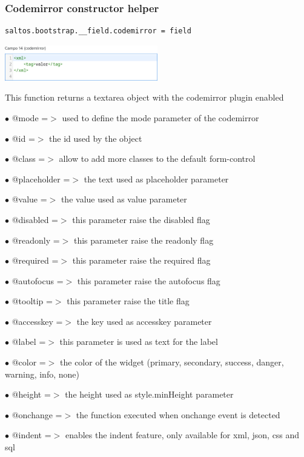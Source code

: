 \documentclass[a4paper]{article}
\begin{document}
\hypertarget{toc60}{}
\subsubsection{Codemirror constructor helper}

\begin{lstlisting}
saltos.bootstrap.__field.codemirror = field
\end{lstlisting}

\begin{center}\includegraphics[width=0.5\textwidth]{../ujest/snaps/test-bootstrap-js-bootstrap-campo-14-codemirror-1-snap.png}\end{center}

This function returns a textarea object with the codemirror plugin enabled

\begin{compactitem}
\item[\color{myblue}$\bullet$] @mode        =$>$ used to define the mode parameter of the codemirror
\item[\color{myblue}$\bullet$] @id          =$>$ the id used by the object
\item[\color{myblue}$\bullet$] @class       =$>$ allow to add more classes to the default form-control
\item[\color{myblue}$\bullet$] @placeholder =$>$ the text used as placeholder parameter
\item[\color{myblue}$\bullet$] @value       =$>$ the value used as value parameter
\item[\color{myblue}$\bullet$] @disabled    =$>$ this parameter raise the disabled flag
\item[\color{myblue}$\bullet$] @readonly    =$>$ this parameter raise the readonly flag
\item[\color{myblue}$\bullet$] @required    =$>$ this parameter raise the required flag
\item[\color{myblue}$\bullet$] @autofocus   =$>$ this parameter raise the autofocus flag
\item[\color{myblue}$\bullet$] @tooltip     =$>$ this parameter raise the title flag
\item[\color{myblue}$\bullet$] @accesskey   =$>$ the key used as accesskey parameter
\item[\color{myblue}$\bullet$] @label       =$>$ this parameter is used as text for the label
\item[\color{myblue}$\bullet$] @color       =$>$ the color of the widget (primary, secondary, success, danger, warning, info, none)
\item[\color{myblue}$\bullet$] @height      =$>$ the height used as style.minHeight parameter
\item[\color{myblue}$\bullet$] @onchange    =$>$ the function executed when onchange event is detected
\item[\color{myblue}$\bullet$] @indent      =$>$ enables the indent feature, only available for xml, json, css and sql
\end{compactitem}
\end{document}

